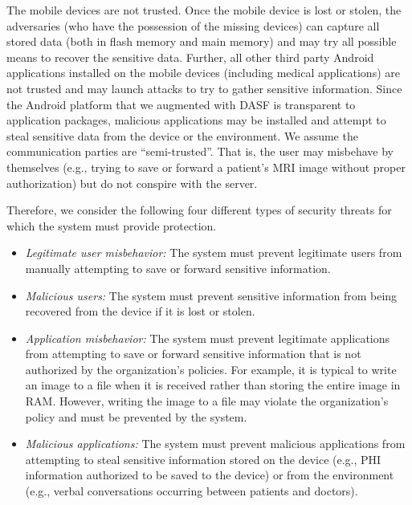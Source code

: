 The mobile devices are not trusted. Once the mobile device 
is lost or stolen, the adversaries (who have the possession of 
the missing devices) can capture all stored data (both in flash 
memory and main memory) and may try all possible means to 
recover the sensitive data. Further, all other third party Android 
applications installed on the mobile devices (including medical 
applications) are not trusted and may launch attacks to try 
to gather sensitive information. Since the Android platform 
that we augmented with DASF is 
transparent to application packages, malicious applications 
may be installed and attempt to steal sensitive data from the 
device or the environment. We assume the communication 
parties are “semi-trusted”. That is, the user may misbehave by
themselves (e.g., trying to save or forward a patient’s MRI 
image without proper authorization) but do not conspire with 
the server. 

Therefore, we consider the following four different types of security
threats for which the system must provide protection. 

\begin{itemize}
\item \textit{Legitimate user misbehavior:} The system must prevent 
legitimate users from manually attempting to save or forward
sensitive information.
\item \textit{Malicious users:} The system must prevent sensitive information
from being recovered from the device if it is lost or stolen.
\item \textit{Application misbehavior:} The system must prevent legitimate
applications from attempting to save or forward
sensitive information that is not authorized by the organization’s
policies. For example, it is typical to write an
image to a file when it is received rather than storing
the entire image in RAM. However, writing the image to
a file may violate the organization’s policy and must be
prevented by the system.
\item \textit{Malicious applications:} The system must prevent malicious
applications from attempting to steal sensitive
information stored on the device (e.g., PHI information
authorized to be saved to the device) or from the environment
(e.g., verbal conversations occurring between
patients and doctors).
\end{itemize}


